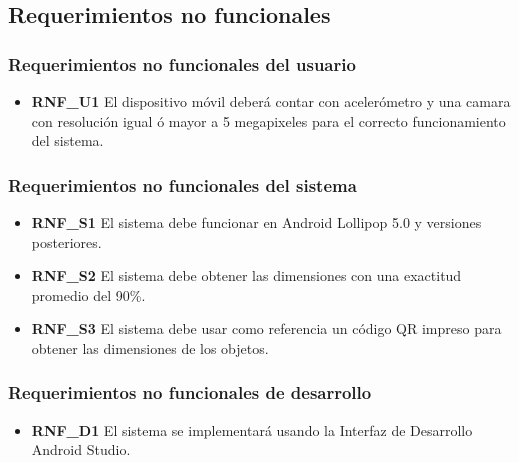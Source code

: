 \subsection{Requerimientos no funcionales}

\subsubsection{Requerimientos no funcionales del usuario}
\begin{itemize}
\item \textbf{RNF\_U1} El dispositivo móvil deberá contar con acelerómetro y una camara con resolución igual ó mayor a 5 megapixeles para el correcto funcionamiento del sistema.
\end{itemize}

\subsubsection{Requerimientos no funcionales del sistema}
\begin{itemize}
\item \textbf{RNF\_S1} El sistema debe funcionar en Android Lollipop 5.0 y versiones posteriores.
\item \textbf{RNF\_S2} El sistema debe obtener las dimensiones con una exactitud promedio del 90\%.
\item \textbf{RNF\_S3} El sistema debe usar como referencia un código QR impreso para obtener las dimensiones de los objetos.
\end{itemize}

\subsubsection{Requerimientos no funcionales de desarrollo}
\begin{itemize}
\item \textbf{RNF\_D1} El sistema se implementará usando la Interfaz de Desarrollo Android Studio.
\end{itemize}